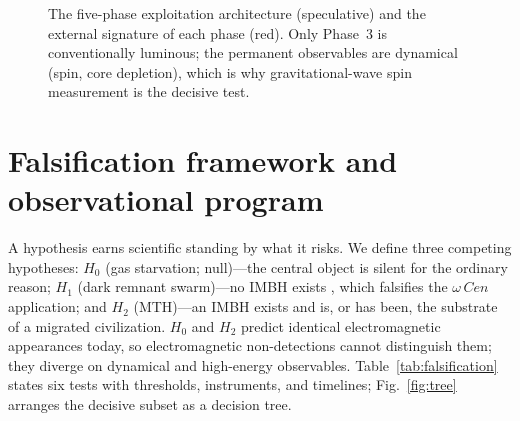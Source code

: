 \documentclass[11pt]{article}
\newcommand{\acen}{\ensuremath{\omega}\,Cen}
\newcommand{\astar}{a_\star}
\begin{document}
\begin{figure}[t]
\centering
{}
\caption{The five-phase exploitation architecture (speculative) and the external signature of each phase (red). Only Phase~3 is conventionally luminous; the permanent observables are dynamical (spin, core depletion), which is why gravitational-wave spin measurement is the decisive test.}
\label{fig:phases}
\end{figure}

\section{Falsification framework and observational program}\label{sec:falsification}
A hypothesis earns scientific standing by what it risks. We define three competing hypotheses: $H_0$ (gas starvation; null)---the central object is silent for the ordinary reason; $H_1$ (dark remnant swarm)---no IMBH exists \citep{banares2025,zocchi2019,breen2013}, which falsifies the $\acen$ application; and $H_2$ (MTH)---an IMBH exists and is, or has been, the substrate of a migrated civilization. $H_0$ and $H_2$ predict identical electromagnetic appearances today, so electromagnetic non-detections cannot distinguish them; they diverge on dynamical and high-energy observables. Table~\ref{tab:falsification} states six tests with thresholds, instruments, and timelines; Fig.~\ref{fig:tree} arranges the decisive subset as a decision tree.
\end{document}
